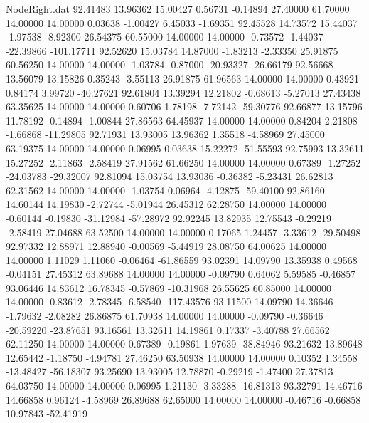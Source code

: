 \begin{filecontents}{NodeRight.dat}
  92.41483   13.96362   15.00427     0.56731   -0.14894   27.40000   61.70000   14.00000   14.00000    0.03638   -1.00427    6.45033   -1.69351
  92.45528   14.73572   15.44037    -1.97538   -8.92300   26.54375   60.55000   14.00000   14.00000   -0.73572   -1.44037  -22.39866 -101.17711
  92.52620   15.03784   14.87000    -1.83213   -2.33350   25.91875   60.56250   14.00000   14.00000   -1.03784   -0.87000  -20.93327  -26.66179
  92.56668   13.56079   13.15826     0.35243   -3.55113   26.91875   61.96563   14.00000   14.00000    0.43921    0.84174    3.99720  -40.27621
  92.61804   13.39294   12.21802    -0.68613   -5.27013   27.43438   63.35625   14.00000   14.00000    0.60706    1.78198   -7.72142  -59.30776
  92.66877   13.15796   11.78192    -0.14894   -1.00844   27.86563   64.45937   14.00000   14.00000    0.84204    2.21808   -1.66868  -11.29805
  92.71931   13.93005   13.96362     1.35518   -4.58969   27.45000   63.19375   14.00000   14.00000    0.06995    0.03638   15.22272  -51.55593
  92.75993   13.32611   15.27252    -2.11863   -2.58419   27.91562   61.66250   14.00000   14.00000    0.67389   -1.27252  -24.03783  -29.32007
  92.81094   15.03754   13.93036    -0.36382   -5.23431   26.62813   62.31562   14.00000   14.00000   -1.03754    0.06964   -4.12875  -59.40100
  92.86160   14.60144   14.19830    -2.72744   -5.01944   26.45312   62.28750   14.00000   14.00000   -0.60144   -0.19830  -31.12984  -57.28972
  92.92245   13.82935   12.75543    -0.29219   -2.58419   27.04688   63.52500   14.00000   14.00000    0.17065    1.24457   -3.33612  -29.50498
  92.97332   12.88971   12.88940    -0.00569   -5.44919   28.08750   64.00625   14.00000   14.00000    1.11029    1.11060   -0.06464  -61.86559
  93.02391   14.09790   13.35938     0.49568   -0.04151   27.45312   63.89688   14.00000   14.00000   -0.09790    0.64062    5.59585   -0.46857
  93.06446   14.83612   16.78345    -0.57869  -10.31968   26.55625   60.85000   14.00000   14.00000   -0.83612   -2.78345   -6.58540 -117.43576
  93.11500   14.09790   14.36646    -1.79632   -2.08282   26.86875   61.70938   14.00000   14.00000   -0.09790   -0.36646  -20.59220  -23.87651
  93.16561   13.32611   14.19861     0.17337   -3.40788   27.66562   62.11250   14.00000   14.00000    0.67389   -0.19861    1.97639  -38.84946
  93.21632   13.89648   12.65442    -1.18750   -4.94781   27.46250   63.50938   14.00000   14.00000    0.10352    1.34558  -13.48427  -56.18307
  93.25690   13.93005   12.78870    -0.29219   -1.47400   27.37813   64.03750   14.00000   14.00000    0.06995    1.21130   -3.33288  -16.81313
  93.32791   14.46716   14.66858     0.96124   -4.58969   26.89688   62.65000   14.00000   14.00000   -0.46716   -0.66858   10.97843  -52.41919

\end{filecontents}
